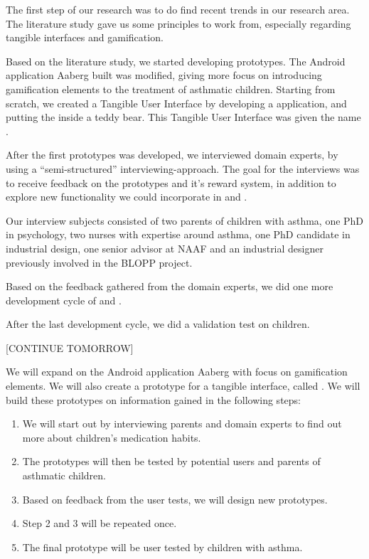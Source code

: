 The first step of our research was to do find recent trends in our research area. The literature study gave us some principles to work from, especially regarding tangible interfaces and gamification. 
 
Based on the literature study, we started developing prototypes. The Android application Aaberg \etal{} built was modified, giving \app{} more focus on introducing gamification elements to the treatment of asthmatic children. Starting from scratch, we created a Tangible User Interface by developing a \rpi{} application, and putting the \rpi{} inside a teddy bear. This Tangible User Interface was given the name \ab{}.       

After the first prototypes was developed, we interviewed domain experts, by using a ``semi-structured'' interviewing-approach. The goal for the interviews was to receive feedback on the prototypes and it's reward system, in addition to explore new functionality we could incorporate in \ab{} and \app{}. 

Our interview subjects consisted of two parents of children with asthma, one PhD in psychology, two nurses with expertise around asthma, one PhD candidate in industrial design, one senior advisor at NAAF and an industrial designer previously involved in the BLOPP project. 

Based on the feedback gathered from the domain experts, we did one more development cycle of \ab{} and \app{}. 

After the last development cycle, we did a validation test on children. 

[CONTINUE TOMORROW]

We will expand on the Android application Aaberg \etal{} with focus on gamification elements. We will also create a prototype for a tangible interface, called \buddy{}. We will build these prototypes on information gained in the following steps:

\begin{enumerate}
  \item We will start out by interviewing parents and domain experts to find out more about children's medication habits.
  \item The prototypes will then be tested by potential users and parents of asthmatic children. 
  \item Based on feedback from the user tests, we will design new prototypes.
  \item Step 2 and 3 will be repeated once. 
  \item The final prototype will be user tested by children with asthma. 
\end{enumerate}
  

